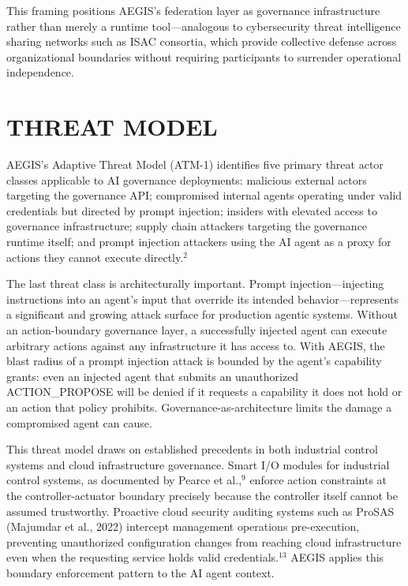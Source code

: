 \documentclass{IEEEcsmag}
\begin{document}
This framing positions AEGIS's federation layer as governance infrastructure rather than merely a runtime tool---analogous to cybersecurity threat intelligence sharing networks such as ISAC consortia, which provide collective defense across organizational boundaries without requiring participants to surrender operational independence.

\section{THREAT MODEL}

AEGIS's Adaptive Threat Model (ATM-1) identifies five primary threat actor classes applicable to AI governance deployments: malicious external actors targeting the governance API; compromised internal agents operating under valid credentials but directed by prompt injection; insiders with elevated access to governance infrastructure; supply chain attackers targeting the governance runtime itself; and prompt injection attackers using the AI agent as a proxy for actions they cannot execute directly.$^{2}$

The last threat class is architecturally important. Prompt injection---injecting instructions into an agent's input that override its intended behavior---represents a significant and growing attack surface for production agentic systems. Without an action-boundary governance layer, a successfully injected agent can execute arbitrary actions against any infrastructure it has access to. With AEGIS, the blast radius of a prompt injection attack is bounded by the agent's capability grants: even an injected agent that submits an unauthorized ACTION\_PROPOSE will be denied if it requests a capability it does not hold or an action that policy prohibits. Governance-as-architecture limits the damage a compromised agent can cause.

This threat model draws on established precedents in both industrial control systems and cloud infrastructure governance. Smart I/O modules for industrial control systems, as documented by Pearce et al.,$^{9}$ enforce action constraints at the controller-actuator boundary precisely because the controller itself cannot be assumed trustworthy. Proactive cloud security auditing systems such as ProSAS (Majumdar et al., 2022) intercept management operations pre-execution, preventing unauthorized configuration changes from reaching cloud infrastructure even when the requesting service holds valid credentials.$^{13}$ AEGIS applies this boundary enforcement pattern to the AI agent context.
\end{document}

